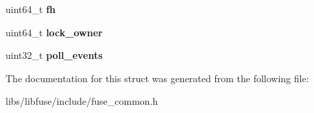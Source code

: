 \begin{DoxyCompactItemize}
\item 
uint64\+\_\+t {\bfseries fh}\hypertarget{structfuse__file__info_a45314d0b92a8d4c9de33d996aa59ada8}{}\label{structfuse__file__info_a45314d0b92a8d4c9de33d996aa59ada8}

\item 
uint64\+\_\+t {\bfseries lock\+\_\+owner}\hypertarget{structfuse__file__info_a3575f36b21f406c211c41c8c31323688}{}\label{structfuse__file__info_a3575f36b21f406c211c41c8c31323688}

\item 
uint32\+\_\+t {\bfseries poll\+\_\+events}\hypertarget{structfuse__file__info_a51b0d5928ec6112456d2aa50f2c35001}{}\label{structfuse__file__info_a51b0d5928ec6112456d2aa50f2c35001}

\end{DoxyCompactItemize}


The documentation for this struct was generated from the following file\+:\begin{DoxyCompactItemize}
\item 
libs/libfuse/include/fuse\+\_\+common.\+h\end{DoxyCompactItemize}

